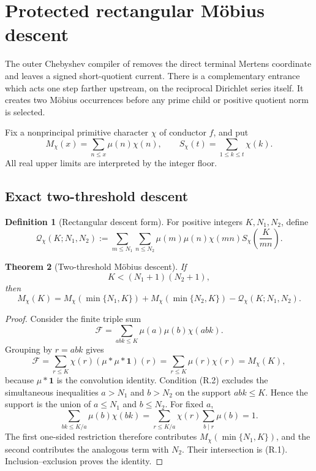 \documentclass[11pt]{article}
\newtheorem{theorem}{Theorem}[section]
\theoremstyle{definition}
\newtheorem{definition}[theorem]{Definition}
\theoremstyle{remark}
\newcommand{\one}{\mathbf 1}
\begin{document}



\section{Protected rectangular M\"obius descent}
\label{sec:grh-rectangular}

The outer Chebyshev compiler of 
removes the direct terminal Mertens coordinate and leaves a signed
short-quotient current.  There is a complementary entrance which acts one
step farther upstream, on the reciprocal Dirichlet series itself.  It creates
two M\"obius occurrences before any prime child or positive quotient norm is
selected.

Fix a nonprincipal primitive character $\chi$ of conductor $f$, and put
\[
 M_\chi(x)=\sum_{n\le x}\mu(n)\chi(n),
 \qquad
 S_\chi(t)=\sum_{1\le k\le t}\chi(k).
\]
All real upper limits are interpreted by the integer floor.

\subsection{Exact two-threshold descent}

\begin{definition}[Rectangular descent form]
\label{def:rectangular-descent}
For positive integers $K,N_1,N_2$, define
\[
 \boxed{
 \mathcal Q_\chi(K;N_1,N_2)
 :=\sum_{m\le N_1}\sum_{n\le N_2}
   \mu(m)\mu(n)\chi(mn)
   S_\chi\!\left(\frac{K}{mn}\right).}
 \tag{R.1}
\]
\end{definition}

\begin{theorem}[Two-threshold M\"obius descent]
\label{thm:rectangular-two-threshold}
If
\[
 K<(N_1+1)(N_2+1),
 \tag{R.2}
\]
then
\[
 \boxed{
 M_\chi(K)
 =M_\chi(\min\{N_1,K\})
  +M_\chi(\min\{N_2,K\})
  -\mathcal Q_\chi(K;N_1,N_2).}
 \tag{R.3}
\]
\end{theorem}

\begin{proof}
Consider the finite triple sum
\[
 \mathcal F=\sum_{abk\le K}\mu(a)\mu(b)\chi(abk).
\]
Grouping by $r=abk$ gives
\[
 \mathcal F
 =\sum_{r\le K}\chi(r)(\mu*\mu*\one)(r)
 =\sum_{r\le K}\mu(r)\chi(r)
 =M_\chi(K),
\]
because $\mu*\one$ is the convolution identity.  Condition \textup{(R.2)}
excludes the simultaneous inequalities $a>N_1$ and $b>N_2$ on the support
$abk\le K$.  Hence the support is the union of $a\le N_1$ and $b\le N_2$.
For fixed $a$,
\[
 \sum_{bk\le K/a}\mu(b)\chi(bk)
 =\sum_{r\le K/a}\chi(r)\sum_{b\mid r}\mu(b)=1.
\]
The first one-sided restriction therefore contributes
$M_\chi(\min\{N_1,K\})$, and the second contributes the analogous term with
$N_2$.  Their intersection is \textup{(R.1)}.  Inclusion--exclusion proves
the identity.
\end{proof}
\end{document}
